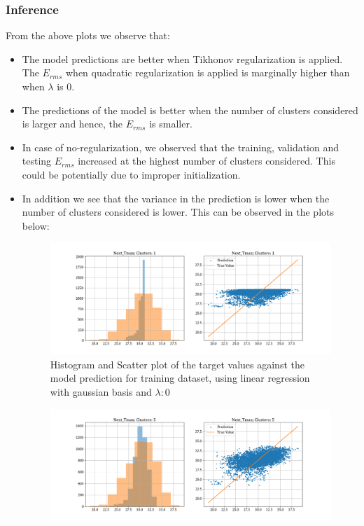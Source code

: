 \documentclass[12pt,a4paper]{article}
\newcommand{\noi}{\noindent}
\begin{document}
\noi


\subsubsection{Inference}
From the above plots we observe that:
\begin{itemize}
    \itemsep0em
    \item The model predictions are better when Tikhonov regularization is applied. The $E_{rms}$ when quadratic regularization is applied is marginally higher than when $\lambda$ is 0.
    \item The predictions of the model is better when the number of clusters considered is larger and hence, the $E_{rms}$ is smaller.
    \item In case of no-regularization, we observed that the training, validation and testing $E_{rms}$ increased at the highest number of clusters considered. This could be potentially due to improper initialization.
    \item In addition we see that the variance in the prediction is lower when the number of clusters considered is lower. This can be observed in the plots below:
    \begin{figure}[H]
        \centering
        \includegraphics[scale=0.4]{images/t3_d3/no_reg/T_max_nclu_1.png}
        \caption{Histogram and Scatter plot of the target values against the model prediction for training dataset, using linear regression with gaussian basis and $\lambda: 0$}
    \end{figure}
    \begin{figure}[H]
        \centering
        \includegraphics[scale=0.4]{images/t3_d3/no_reg/T_max_nclu_5.png}

\end{figure}
\end{itemize}
\end{document}
